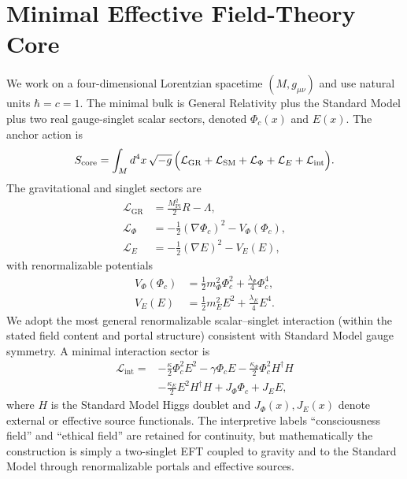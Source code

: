 \documentclass[aps,prd,twocolumn,superscriptaddress,nofootinbib]{revtex4-2}
\begin{document}
\section{Minimal Effective Field-Theory Core}
We work on a four-dimensional Lorentzian spacetime $(M,g_{\mu\nu})$ and use natural units $\hbar=c=1$. The minimal bulk is General Relativity plus the Standard Model plus two real gauge-singlet scalar sectors, denoted $\Phi_c(x)$ and $E(x)$. The anchor action is
\begin{equation}
S_{\mathrm{core}} = \int_M d^4x\,\sqrt{-g}\,\Bigl(\mathcal{L}_{\mathrm{GR}}+\mathcal{L}_{\mathrm{SM}}+\mathcal{L}_{\Phi}+\mathcal{L}_{E}+\mathcal{L}_{\mathrm{int}}\Bigr).
\label{eq:score}
\end{equation}
The gravitational and singlet sectors are
\begin{align}
\mathcal{L}_{\mathrm{GR}} &= \frac{M_{\mathrm{Pl}}^2}{2}R - \Lambda, \\
\mathcal{L}_{\Phi} &= -\frac{1}{2}(\nabla\Phi_c)^2 - V_{\Phi}(\Phi_c), \\
\mathcal{L}_{E} &= -\frac{1}{2}(\nabla E)^2 - V_E(E),
\end{align}
with renormalizable potentials
\begin{align}
V_{\Phi}(\Phi_c) &= \frac{1}{2}m_{\Phi}^2\Phi_c^2 + \frac{\lambda_{\Phi}}{4}\Phi_c^4,\\
V_E(E) &= \frac{1}{2}m_E^2E^2 + \frac{\lambda_E}{4}E^4.
\end{align}
We adopt the most general renormalizable scalar--singlet interaction (within the stated field content and portal structure) consistent with Standard Model gauge symmetry.
A minimal interaction sector is
\begin{equation}
\begin{split}
\mathcal{L}_{\mathrm{int}} = {}&-\frac{\kappa}{2}\Phi_c^2E^2 - \gamma\Phi_c E - \frac{\kappa_{\Phi}}{2}\Phi_c^2 H^{\dagger}H \\
&- \frac{\kappa_E}{2}E^2 H^{\dagger}H + J_{\Phi}\Phi_c + J_E E,
\end{split}
\label{eq:Lint}
\end{equation}
where $H$ is the Standard Model Higgs doublet and $J_{\Phi}(x),J_E(x)$ denote external or effective source functionals. The interpretive labels ``consciousness field'' and ``ethical field'' are retained for continuity, but mathematically the construction is simply a two-singlet EFT coupled to gravity and to the Standard Model through renormalizable portals and effective sources.
\end{document}
